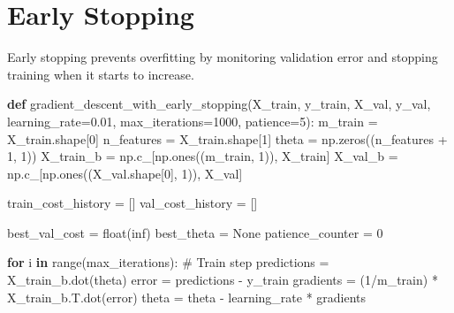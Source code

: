 \documentclass[
  letterpaper,
  DIV=11,
  numbers=noendperiod]{scrreprt}
\newenvironment{Shaded}{\begin{snugshade}}{\end{snugshade}}
\newcommand{\BuiltInTok}[1]{\textcolor[rgb]{0.00,0.23,0.31}{#1}}
\newcommand{\CommentTok}[1]{\textcolor[rgb]{0.37,0.37,0.37}{#1}}
\newcommand{\ControlFlowTok}[1]{\textcolor[rgb]{0.00,0.23,0.31}{\textbf{#1}}}
\newcommand{\DecValTok}[1]{\textcolor[rgb]{0.68,0.00,0.00}{#1}}
\newcommand{\FloatTok}[1]{\textcolor[rgb]{0.68,0.00,0.00}{#1}}
\newcommand{\KeywordTok}[1]{\textcolor[rgb]{0.00,0.23,0.31}{\textbf{#1}}}
\newcommand{\NormalTok}[1]{\textcolor[rgb]{0.00,0.23,0.31}{#1}}
\newcommand{\OperatorTok}[1]{\textcolor[rgb]{0.37,0.37,0.37}{#1}}
\newcommand{\StringTok}[1]{\textcolor[rgb]{0.13,0.47,0.30}{#1}}
\newcommand{\VariableTok}[1]{\textcolor[rgb]{0.07,0.07,0.07}{#1}}
\begin{document}
\section{Early Stopping}\label{early-stopping-1}

Early stopping prevents overfitting by monitoring validation error and
stopping training when it starts to increase.

\begin{Shaded}
\begin{Highlighting}[]
\KeywordTok{def}\NormalTok{ gradient\_descent\_with\_early\_stopping(X\_train, y\_train, X\_val, y\_val, learning\_rate}\OperatorTok{=}\FloatTok{0.01}\NormalTok{, max\_iterations}\OperatorTok{=}\DecValTok{1000}\NormalTok{, patience}\OperatorTok{=}\DecValTok{5}\NormalTok{):}
\NormalTok{    m\_train }\OperatorTok{=}\NormalTok{ X\_train.shape[}\DecValTok{0}\NormalTok{]}
\NormalTok{    n\_features }\OperatorTok{=}\NormalTok{ X\_train.shape[}\DecValTok{1}\NormalTok{]}
\NormalTok{    theta }\OperatorTok{=}\NormalTok{ np.zeros((n\_features }\OperatorTok{+} \DecValTok{1}\NormalTok{, }\DecValTok{1}\NormalTok{))}
\NormalTok{    X\_train\_b }\OperatorTok{=}\NormalTok{ np.c\_[np.ones((m\_train, }\DecValTok{1}\NormalTok{)), X\_train]}
\NormalTok{    X\_val\_b }\OperatorTok{=}\NormalTok{ np.c\_[np.ones((X\_val.shape[}\DecValTok{0}\NormalTok{], }\DecValTok{1}\NormalTok{)), X\_val]}
    
\NormalTok{    train\_cost\_history }\OperatorTok{=}\NormalTok{ []}
\NormalTok{    val\_cost\_history }\OperatorTok{=}\NormalTok{ []}
    
\NormalTok{    best\_val\_cost }\OperatorTok{=} \BuiltInTok{float}\NormalTok{(}\StringTok{\textquotesingle{}inf\textquotesingle{}}\NormalTok{)}
\NormalTok{    best\_theta }\OperatorTok{=} \VariableTok{None}
\NormalTok{    patience\_counter }\OperatorTok{=} \DecValTok{0}
    
    \ControlFlowTok{for}\NormalTok{ i }\KeywordTok{in} \BuiltInTok{range}\NormalTok{(max\_iterations):}
        \CommentTok{\# Train step}
\NormalTok{        predictions }\OperatorTok{=}\NormalTok{ X\_train\_b.dot(theta)}
\NormalTok{        error }\OperatorTok{=}\NormalTok{ predictions }\OperatorTok{{-}}\NormalTok{ y\_train}
\NormalTok{        gradients }\OperatorTok{=}\NormalTok{ (}\DecValTok{1}\OperatorTok{/}\NormalTok{m\_train) }\OperatorTok{*}\NormalTok{ X\_train\_b.T.dot(error)}
\NormalTok{        theta }\OperatorTok{=}\NormalTok{ theta }\OperatorTok{{-}}\NormalTok{ learning\_rate }\OperatorTok{*}\NormalTok{ gradients}
        

\end{Highlighting}
\end{Shaded}
\end{document}
